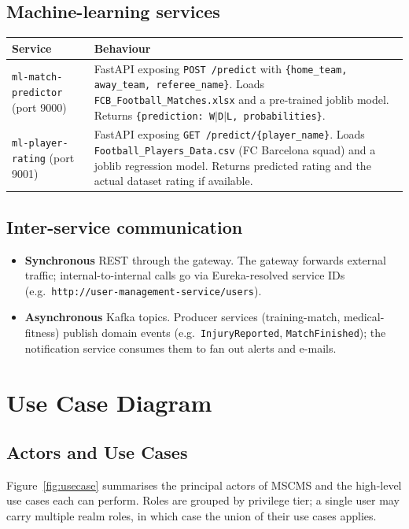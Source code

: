 \documentclass[12pt,a4paper,oneside]{report}
\begin{document}
\subsection{Machine-learning services}

\begin{longtable}{p{} p{}}
\toprule
\textbf{Service} & \textbf{Behaviour} \\
\midrule
\texttt{ml-match-predictor} (port 9000) &
  FastAPI exposing \texttt{POST /predict} with
  \texttt{\{home\_team, away\_team, referee\_name\}}. Loads
  \texttt{FCB\_Football\_Matches.xlsx} and a pre-trained joblib model.
  Returns \texttt{\{prediction: W$|$D$|$L, probabilities\}}. \\
\texttt{ml-player-rating} (port 9001) &
  FastAPI exposing \texttt{GET /predict/\{player\_name\}}. Loads
  \texttt{Football\_Players\_Data.csv} (FC Barcelona squad) and a
  joblib regression model. Returns predicted rating and the actual
  dataset rating if available. \\
\bottomrule
\end{longtable}

\subsection{Inter-service communication}
\begin{itemize}[leftmargin=*]
  \item \textbf{Synchronous} REST through the gateway. The gateway forwards
        external traffic; internal-to-internal calls go via Eureka-resolved
        service IDs (e.g.\ \texttt{http://user-management-service/users}).
  \item \textbf{Asynchronous} Kafka topics. Producer services
        (training-match, medical-fitness) publish domain events
        (e.g.\ \texttt{InjuryReported}, \texttt{MatchFinished}); the
        notification service consumes them to fan out alerts and e-mails.
\end{itemize}

\section{Use Case Diagram}
\label{sec:usecases}

\subsection{Actors and Use Cases}
Figure~\ref{fig:usecase} summarises the principal actors of MSCMS and the
high-level use cases each can perform. Roles are grouped by privilege
tier; a single user may carry multiple realm roles, in which case the
union of their use cases applies.
\end{document}
